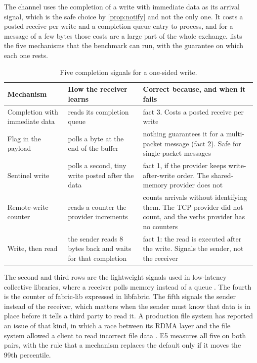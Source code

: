 The channel uses the completion of a write with immediate data as its arrival
signal, which is the safe choice by \cref{prop:notify} and not the only one.
It costs a posted receive per write and a completion queue entry to process,
and for a message of a few bytes those costs are a large part of the whole
exchange.  lists the five mechanisms that the benchmark can
run, with the guarantee on which each one rests.

\begin{table}[htbp]
  \centering
  \caption[Five completion signals for a one-sided write]{Five completion signals for a one-sided write.}
  \label{tab:signals}
  \small
  \begin{tabular}{L{3.1cm}L{5.2cm}L{5.9cm}}
    \toprule
    Mechanism & How the receiver learns & Correct because, and when it fails \\
    \midrule
    Completion with immediate data & reads its completion queue & fact 3. Costs a posted receive per write \\
    Flag in the payload & polls a byte at the end of the buffer & nothing guarantees it for a multi-packet message (fact 2). Safe for single-packet messages \\
    Sentinel write & polls a second, tiny write posted after the data & fact 1, if the provider keeps write-after-write order. The shared-memory provider does not \\
    Remote-write counter & reads a counter the provider increments & counts arrivals without identifying them. The TCP provider did not count, and the verbs provider has no counters \\
    Write, then read & the sender reads 8 bytes back and waits for that completion & fact 1: the read is executed after the write. Signals the sender, not the receiver \\
    \bottomrule
  \end{tabular}
\end{table}

The second and third rows are the lightweight signals used in low-latency
collective libraries, where a receiver polls memory instead of a queue
\citep{shen2026sol}. The fourth is the counter of fabric-lib
\citep{licker2026fabriclib} expressed in libfabric. The fifth signals the sender instead of the receiver, which matters when the
sender must know that data is in place before it tells a third party to read
it. A production file system has reported an issue of that kind, in which a
race between its RDMA layer and the file system allowed a client to read
incorrect file data \citep{ibm_ij44629}. E5 measures all five on both pairs,
with the rule that a mechanism replaces the default only if it moves the 99th
percentile.

